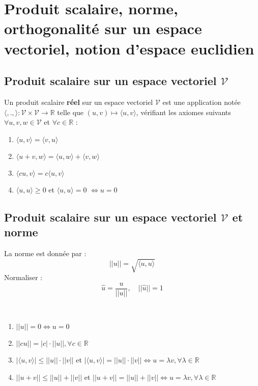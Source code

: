 \section{Produit scalaire, norme, orthogonalité sur un espace vectoriel, notion d'espace euclidien}
	\subsection{Produit scalaire sur un espace vectoriel $\mathcal{V}$}  
		\begin{mydef}
			Un produit scalaire \textbf{réel} sur un espace vectoriel $\mathcal{V}$ est une application notée $\langle ,., \rangle : \mathcal{V}\times \mathcal{V} \longrightarrow\mathbb{R}$ telle que $(u,v)\longmapsto \langle u,v \rangle$, vérifiant les axiomes suivants $\forall u,v,w\in \mathcal{V}$ et $ \forall c\in\mathbb{R}$  :
			\begin{enumerate}
				\item $\langle u,v \rangle = \langle v,u \rangle$
				\item $\langle u+v, w \rangle=\langle u,w \rangle +\langle v, w \rangle$
				\item $\langle cu,v \rangle=c\langle u,v \rangle$
				\item $\langle u,u \rangle\geq 0$ et $\langle u,u \rangle=0$ $\Longleftrightarrow u=0$
			\end{enumerate}
		\end{mydef}
	\subsection{Produit scalaire sur un espace vectoriel  $\mathcal{V}$ et norme}
		\begin{mydef}
			\index{Norme}
			\index{Unitaire}
			La norme est donnée par :
			\[||u||=\sqrt{\langle u,u\rangle}\]
			Normaliser :
			\[\hat{u}=\frac{u}{||u||},\quad||\hat{u}||=1\]
		\end{mydef}
		\begin{myprop}
			 ~
			\begin{enumerate}
				\item $||u||= 0 \Longleftrightarrow u=0$
				\item $||cu|| =|c|\cdot||u||,\forall c\in\mathbb{R}$
				\item $|\langle u,v \rangle|\leq ||u||\cdot||v||$ et $|\langle u,v \rangle|= ||u||\cdot||v||\Longleftrightarrow u=\lambda v,\forall \lambda\in\mathbb{R}$
				\item $||u+v||\leq||u||+||v||$ et $||u+v||=||u||+||v||\Longleftrightarrow u=\lambda v,\forall \lambda\in\mathbb{R}$
			\end{enumerate}
		\end{myprop}
